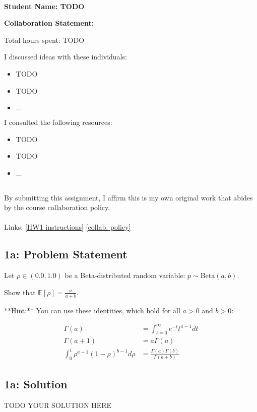 \documentclass[10pt]{article}
\newcommand{\officialdirections}[1]{{\color{purple} #1}}
\begin{document}
~~\\ %

{\Large{\bf Student Name: TODO}}

\Large{\bf Collaboration Statement:}

Total hours spent: TODO

I discussed ideas with these individuals:
\begin{itemize}
\item TODO
\item TODO
\item $\ldots$	
\end{itemize}

I consulted the following resources:
\begin{itemize}
\item TODO
\item TODO
\item $\ldots$	
\end{itemize}
~~\\
By submitting this assignment, I affirm this is my own original work that abides by the course collaboration policy.
~~\\
~~\\
Links: 
\href{https://www.cs.tufts.edu/cs/136/2023s/hw1.html}{[HW1 instructions]} 
\href{https://www.cs.tufts.edu/cs/136/2023s/index.html#collaboration}{[collab. policy]} 

\tableofcontents

\newpage

\officialdirections{
\subsection*{1a: Problem Statement}

Let $\rho \in (0.0, 1.0)$ be a Beta-distributed random variable: $p \sim \text{Beta}(a, b)$. 

Show that $\mathbb{E}[ \rho ] = \frac{a}{a + b}$.

**Hint:** You can use these identities, which hold for all $a > 0$ and $b > 0$:

\begin{align}
\Gamma(a) &= \int_{t=0}^{\infty} e^{-t} t^{a-1} dt
\\
\Gamma(a+1) &= a \Gamma(a)
\\
\int_{0}^1 \rho^{a-1} (1-\rho)^{b-1} d\rho &= \frac{\Gamma(a)\Gamma(b)}{\Gamma(a+b)}
\end{align}
}

\subsection{1a: Solution}
TODO YOUR SOLUTION HERE
\end{document}
